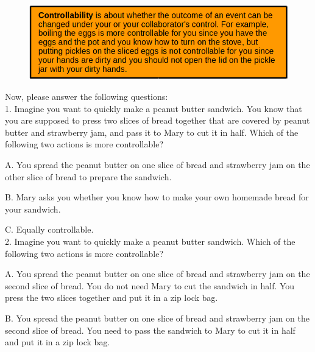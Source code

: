 \documentclass[12pt]{report}
\begin{document}
\begin{appendices}

\begin{figure}[tbh]
 \centering
 \includegraphics[width=1\textwidth]{figure/controllability-definition.png}
\end{figure}

Now, please answer the following questions:\\

1. Imagine you want to quickly make a peanut butter sandwich. You know that you are supposed to press two slices of bread together that are covered by peanut butter and strawberry jam, and pass it to Mary to cut it in half. Which of the following two actions is more controllable?

A. You spread the peanut butter on one slice of bread and strawberry jam on the other slice of bread to prepare the sandwich.

B. Mary asks you whether you know how to make your own homemade bread for your sandwich.

C. Equally controllable.\\


2. Imagine you want to quickly make a peanut butter sandwich. Which of the following two actions is more controllable?

A. You spread the peanut butter on one slice of bread and strawberry jam on the second slice of bread. You do not need Mary to cut the sandwich in half. You press the two slices together and put it in a zip lock bag.

B. You spread the peanut butter on one slice of bread and strawberry jam on the second slice of bread. You need to pass the sandwich to Mary to cut it in half and put it in a zip lock bag.


\end{appendices}
\end{document}
